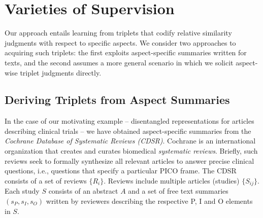 \documentclass[11pt,a4paper]{article}
\begin{document}


\section{Varieties of Supervision}
Our approach entails learning from triplets that codify relative similarity judgments with respect to specific aspects. We consider two approaches to acquiring such triplets: the first exploits aspect-specific summaries written for texts, and the second assumes a more general scenario in which we solicit aspect-wise triplet judgments directly.

\subsection{Deriving Triplets from Aspect Summaries}

In the case of our motivating example 
-- 
disentangled representations for articles describing clinical trials 
-- 
we have obtained aspect-specific summaries from the \emph{Cochrane Database of Systematic Reviews (CDSR)}. Cochrane is an international organization that creates and curates biomedical \emph{systematic reviews}. Briefly, such reviews seek to formally synthesize all relevant articles to answer precise clinical questions, i.e., questions that specify a particular PICO frame. The CDSR consists of a set of reviews $\{R_i\}$. Reviews include multiple articles (studies) $\{S_{ij}\}$. Each study $S$ consists of an abstract $A$ and a set of free text summaries $(s_P, s_I, s_O)$ written by reviewers describing the respective P, I and O elements in $S$.
\end{document}

